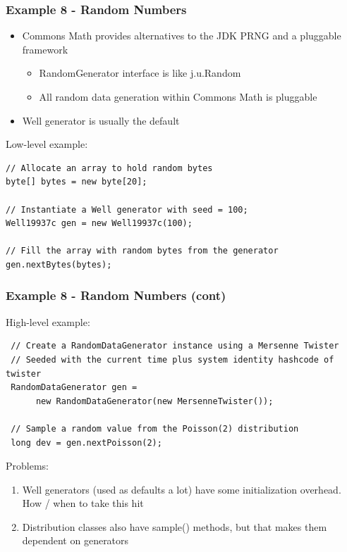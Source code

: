 \documentclass[14pt,mathserif]{beamer}
\begin{document}
\begin{frame}[fragile]
  \frametitle{Example 8 - Random Numbers}
  
\begin{small}
\begin{itemize}  
\item Commons Math provides alternatives to the JDK PRNG and a pluggable framework
\begin{itemize}
\item RandomGenerator interface is like j.u.Random
\item All random data generation within Commons Math is pluggable
\end {itemize}
\item Well generator is usually the default
\end{itemize}

Low-level example:

\begin{verbatim}
// Allocate an array to hold random bytes
byte[] bytes = new byte[20];

// Instantiate a Well generator with seed = 100;
Well19937c gen = new Well19937c(100);

// Fill the array with random bytes from the generator
gen.nextBytes(bytes);
\end{verbatim}
\end{small}
\end{frame}

\begin{frame}[fragile]
  \frametitle{Example 8 - Random Numbers (cont)}  
  
High-level example:

\begin{verbatim}
 // Create a RandomDataGenerator instance using a Mersenne Twister 
 // Seeded with the current time plus system identity hashcode of twister
 RandomDataGenerator gen = 
      new RandomDataGenerator(new MersenneTwister());
      
 // Sample a random value from the Poisson(2) distribution
 long dev = gen.nextPoisson(2);
 \end{verbatim}

Problems:
\begin{enumerate}
\item Well generators (used as defaults a lot) have some initialization overhead.  How
/ when to take this hit
\item Distribution classes also have sample() methods, but that makes them dependent on
generators
\end{enumerate}
\end{frame}
\end{document}

